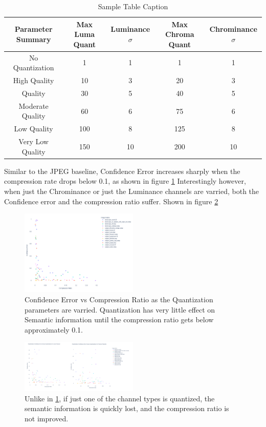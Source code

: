 \begin{table}[h!]
\centering
\caption{Sample Table Caption}
\label{tab:Quantization Parameters Table}
\begin{tabular}{c|c|c|c|c}
\toprule
\textbf{Parameter Summary} & \textbf{Max Luma Quant} & \textbf{Luminance $\sigma$} & \textbf{Max Chroma Quant} & \textbf{Chrominance $\sigma$} \\
\midrule
No Quantization & 1 & 1 & 1 & 1 \\
High Quality & 10 & 3 & 20 & 3 \\
Quality & 30 & 5 & 40 & 5 \\
Moderate Quality & 60 & 6 & 75 & 6 \\
Low Quality & 100 & 8 & 125 & 8 \\
Very Low Quality & 150 & 10 & 200 & 10 \\
\bottomrule
\end{tabular}
\end{table}

Similar to the JPEG baseline, Confidence Error increases sharply when the compression rate drops below 0.1, as shown in figure \ref{fig:Confidence vs Quantization}
Interestingly however, when just the Chrominance or just the Luminance channels are varried, both the Confidence error and the compression ratio suffer. Shown in figure \ref{fig:just chroma or luma downsampling}

\begin{figure}
    \label{fig:Confidence vs Quantization}
    \includegraphics[width=0.5\textwidth]{assets/Quantization Sweep No Title Chrominance and Luminance.png}
    \caption{Confidence Error vs Compression Ratio as the Quantization parameters are varried. Quantization has very little effect on Semantic information until the compression ratio gets below approximately 0.1.}
\end{figure}
\begin{figure}
    \label{fig:just chroma or luma downsampling}
    \includegraphics[width=0.5\textwidth]{assets/Chroma and Luma downsampling combined.png}
    \caption{Unlike in \ref{fig:Confidence vs Quantization}, if just one of the channel types is quantized, the semantic information is quickly lost, and the compression ratio is not improved.}
\end{figure}

